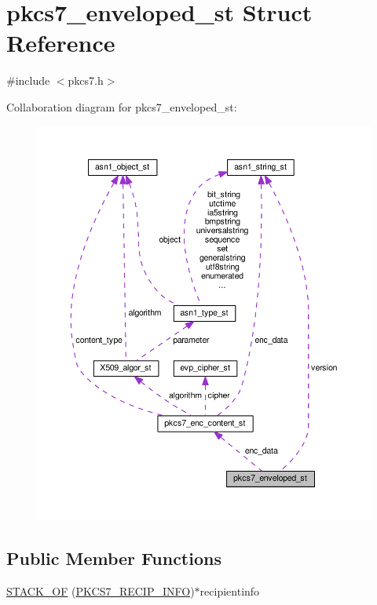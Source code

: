 \hypertarget{structpkcs7__enveloped__st}{}\section{pkcs7\+\_\+enveloped\+\_\+st Struct Reference}
\label{structpkcs7__enveloped__st}


{\ttfamily \#include $<$pkcs7.\+h$>$}



Collaboration diagram for pkcs7\+\_\+enveloped\+\_\+st\+:
\nopagebreak
\begin{figure}[H]
\begin{center}
\leavevmode
\includegraphics[width=350pt]{structpkcs7__enveloped__st__coll__graph}
\end{center}
\end{figure}
\subsection*{Public Member Functions}
\begin{DoxyCompactItemize}
\item 
\hyperlink{structpkcs7__enveloped__st_ab79505d091a2289a9c5fd3d3131a7daf}{S\+T\+A\+C\+K\+\_\+\+OF} (\hyperlink{pkcs7_8h_a8b0ed73366ea46f65dfaa11ae7882dad}{P\+K\+C\+S7\+\_\+\+R\+E\+C\+I\+P\+\_\+\+I\+N\+FO})$\ast$recipientinfo
\end{DoxyCompactItemize}

